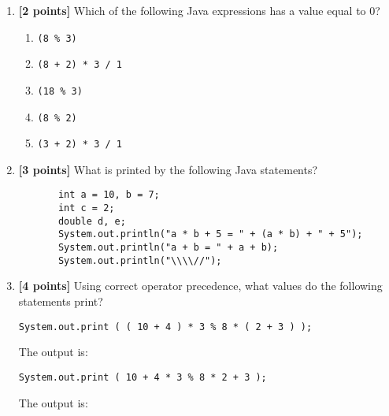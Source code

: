 \documentclass[11pt]{report}
\begin{document}
\begin{enumerate}
\bigskip

\item {\bf [2 points]}
Which of the following Java expressions has a value equal to 0?
\begin{enumerate}
  \item {\tt (8 \% 3)}
  \item {\tt (8 + 2) * 3 / 1}
  \item {\tt (18 \% 3)}
  \item {\tt (8 \% 2)}
  \item {\tt (3 + 2) * 3 / 1}
\end{enumerate}

\bigskip


\item {\bf [3 points]}
What is printed by the following Java statements? 
\begin{verbatim}
       int a = 10, b = 7;
       int c = 2;
       double d, e;
       System.out.println("a * b + 5 = " + (a * b) + " + 5");
       System.out.println("a + b = " + a + b);
       System.out.println("\\\\//");
\end{verbatim}
\vspace{1.0in}

\newpage
\item {\bf [4 points]}
Using correct operator precedence, what values do the following statements print?

\begin{verbatim}
System.out.print ( ( 10 + 4 ) * 3 % 8 * ( 2 + 3 ) ); 		
\end{verbatim}

\vspace*{-.175in}
The output is: \mbox{\underline{\hspace{3in}}}

\begin{verbatim}
System.out.print ( 10 + 4 * 3 % 8 * 2 + 3 );				    
\end{verbatim}	

\vspace*{-.175in}
The output is: \mbox{\underline{\hspace{3in}}}

\medskip



\end{enumerate}
\end{document}
